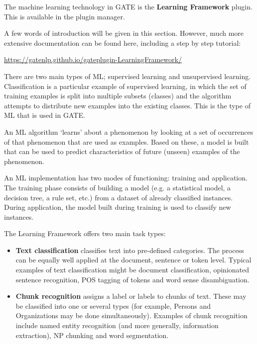 

The machine learning technology in GATE is the \textbf{Learning
Framework} plugin. This is available in the plugin manager.

A few words of introduction will be given in this section. However,
much more extensive documentation can be found here, including a step
by step tutorial:

\url{https://gatenlp.github.io/gateplugin-LearningFramework/}


There are two main types of ML; supervised learning and unsupervised
learning. Classification is a particular example of supervised
learning, in which the set of training examples is split into multiple
subsets (classes) and the algorithm attempts to distribute new
examples into the existing classes. This is the type of ML that is
used in GATE.

An ML algorithm `learns' about a phenomenon by looking at a set of occurrences
of that phenomenon that are used as examples. Based on these, a model is built
that can be used to predict characteristics of future (unseen) examples of the
phenomenon.

An ML implementation has two modes of functioning: training and application.  The
training phase consists of building a model (e.g. a statistical model, a decision
tree, a rule set, etc.) from a dataset of already classified instances.  During
application, the model built during training is used to classify new instances.

The Learning Framework offers two main task types:

\begin{itemize}
  
\item {\bf Text classification}
classifies text into pre-defined categories. The process can be
equally well applied at the document, sentence or token level. Typical
examples of text classification might be document classification,
opinionated sentence recognition, POS tagging of tokens and word sense
disambiguation.

\item {\bf Chunk recognition} assigns a label or labels to
chunks of text. These may be classified into one or several types (for
example, Persons and Organizations may be done
simultaneously). Examples of chunk recognition include named entity
recognition (and more generally, information extraction), NP chunking
and word segmentation.

\end{itemize}

